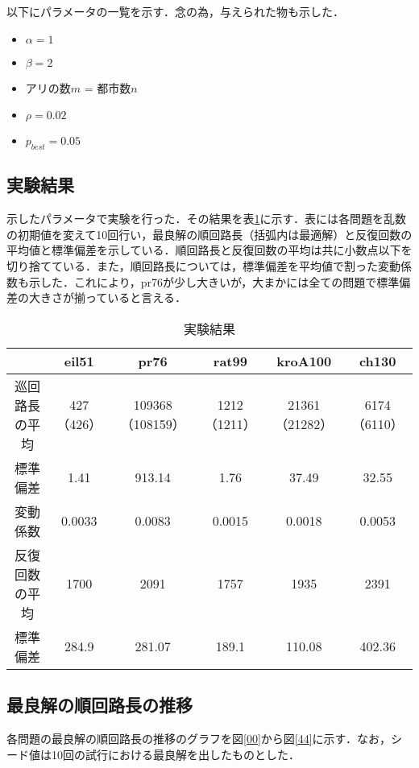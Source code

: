 \documentclass[a4j]{jarticle}
\begin{document}
\par 以下にパラメータの一覧を示す．念の為，与えられた物も示した．
\begin{itemize}
 \item $\alpha = 1$
 \item $\beta = 2$
 \item アリの数$m$ = 都市数$n$
 \item $\rho = 0.02$
 \item $p_{best} = 0.05$
\end{itemize}

\subsection*{実験結果}
示したパラメータで実験を行った．その結果を表\ref{result}に示す．表には各問題を乱数の初期値を変えて10回行い，最良解の順回路長（括弧内は最適解）と反復回数の平均値と標準偏差を示している．順回路長と反復回数の平均は共に小数点以下を切り捨てている．また，順回路長については，標準偏差を平均値で割った変動係数も示した．これにより，pr76が少し大きいが，大まかには全ての問題で標準偏差の大きさが揃っていると言える．

\begin{table}[H]
 \begin{center}
  \caption{実験結果}
  \label{result}
  \begin{tabular}[tb]{|c|c|c|c|c|c|} \hline
 & eil51 & pr76 & rat99 & kroA100 & ch130 \\\hline
巡回路長の平均 & 427（426） & 109368（108159） & 1212（1211） & 21361（21282） & 6174（6110） \\\hline
標準偏差 & 1.41 & 913.14 & 1.76 & 37.49 & 32.55 \\\hline
変動係数 & 0.0033 & 0.0083 & 0.0015 & 0.0018 & 0.0053 \\\hline
反復回数の平均 & 1700 & 2091 & 1757 & 1935 & 2391 \\\hline
標準偏差 & 284.9 & 281.07 & 189.1 & 110.08 & 402.36 \\\hline
  \end{tabular}
 \end{center}
\end{table}

\subsection*{最良解の順回路長の推移}
各問題の最良解の順回路長の推移のグラフを図\ref{00}から図\ref{44}に示す．なお，シード値は10回の試行における最良解を出したものとした．
\end{document}
